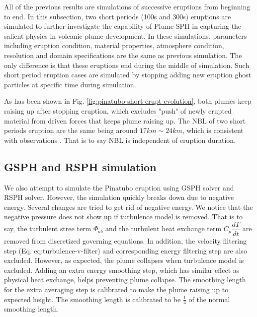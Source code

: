 All of the previous results are simulations of successive eruptions from beginning to end. In this subsection, two short periods (100s and 300s) eruptions are simulated to further investigate the capability of Plume-SPH in capturing the salient physics in volcanic plume development. In these simulations, parameters including eruption condition, material properties, atmosphere condition, resolution and domain specifications are the same as previous simulation. The only difference is that these eruptions end during the middle of simulation. Such short period eruption cases are simulated by stopping adding new eruption ghost particles at specific time during simulation.

As has been shown in Fig. \ref{fig:pinatubo-short-erupt-evolution}, both plumes keep raising up after stopping eruption, which excludes "push" of newly erupted material from driven forces that keeps plume raising up. The NBL of two short periods eruption are the same being around $17 km \sim 24 km$, which is consistent with observations \citep[][e.g.]{jager1992pinatubo, avdyushin19931, defoor1992early}. That is to say NBL is independent of eruption duration.

\subsection{GSPH and RSPH simulation}
We also attempt to simulate the Pinatubo eruption using GSPH solver and RSPH solver. However, the simulation quickly breaks down due to negative energy. Several changes are tried to get rid of negative energy.
We notice that the negative pressure does not show up if turbulence model is removed. That is to say, the turbulent stree term $\Phi_{ab}$ and the turbulent heat exchange term $C_p \dfrac{dT}{dt}$ are removed from discretized governing equations. In addition, the velocity filtering step (Eq. {eq:turbulence-v-filter}) and corresponding energy filtering step are also excluded. However, as expected, the plume collapses when turbulence model is excluded. Adding an extra energy smoothing step, which has similar effect as physical heat exchange, helps preventing plume collapse. The smoothing length for the extra averaging step is calibrated to make the plume raising up to expected height. The smoothing length is calibrated to be $\frac{1}{4}$  of the normal smoothing length.

